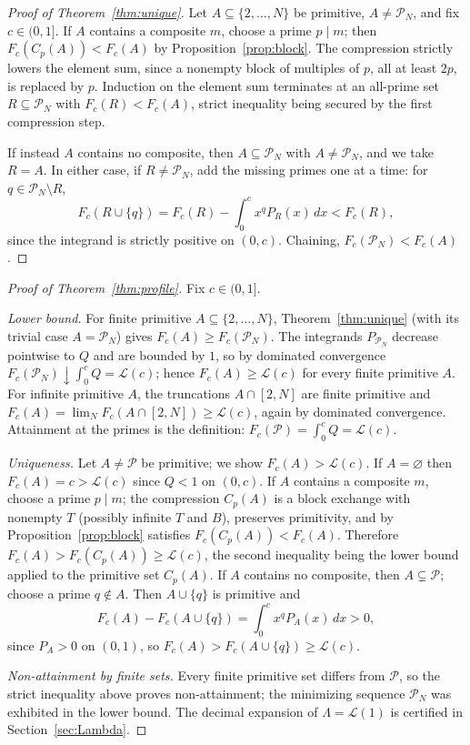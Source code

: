 \documentclass[11pt]{article}
\theoremstyle{remark}
\newcommand{\Prm}{\mathcal{P}}
\begin{document}
\begin{proof}[Proof of Theorem~\ref{thm:unique}]
Let $A\subseteq\{2,\dots,N\}$ be primitive, $A\ne\Prm_N$, and fix
$c\in(0,1]$. If $A$ contains a composite $m$, choose a prime $p\mid m$;
then $F_c(C_p(A))<F_c(A)$ by Proposition~\ref{prop:block}. The
compression strictly lowers the element sum, since a nonempty block of
multiples of $p$, all at least $2p$, is replaced by $p$. Induction on
the element sum terminates at an all-prime set $R\subseteq\Prm_N$ with
$F_c(R)<F_c(A)$, strict inequality being secured by the first
compression step.

If instead $A$ contains no composite, then $A\subseteq\Prm_N$ with
$A\ne\Prm_N$, and we take $R=A$. In either case, if $R\ne\Prm_N$, add
the missing primes one at a time: for $q\in\Prm_N\setminus R$,
\[
  F_c(R\cup\{q\})=F_c(R)-\int_0^cx^qP_R(x)\,dx<F_c(R),
\]
since the integrand is strictly positive on $(0,c)$. Chaining,
$F_c(\Prm_N)<F_c(A)$.
\end{proof}

\begin{proof}[Proof of Theorem~\ref{thm:profile}]
Fix $c\in(0,1]$.

\emph{Lower bound.} For finite primitive $A\subseteq\{2,\dots,N\}$,
Theorem~\ref{thm:unique} (with its trivial case $A=\Prm_N$) gives
$F_c(A)\ge F_c(\Prm_N)$. The integrands $P_{\Prm_N}$ decrease pointwise
to $Q$ and are bounded by $1$, so by dominated convergence
$F_c(\Prm_N)\downarrow\int_0^cQ=\mathcal L(c)$; hence
$F_c(A)\ge\mathcal L(c)$ for every finite primitive $A$. For infinite
primitive $A$, the truncations $A\cap[2,N]$ are finite primitive and
$F_c(A)=\lim_NF_c(A\cap[2,N])\ge\mathcal L(c)$, again by dominated
convergence. Attainment at the primes is the definition:
$F_c(\Prm)=\int_0^cQ=\mathcal L(c)$.

\emph{Uniqueness.} Let $A\ne\Prm$ be primitive; we show
$F_c(A)>\mathcal L(c)$. If $A=\varnothing$ then $F_c(A)=c>\mathcal L(c)$
since $Q<1$ on $(0,c)$. If $A$ contains a composite $m$, choose a prime
$p\mid m$; the compression $C_p(A)$ is a block exchange with nonempty
$T$ (possibly infinite $T$ and $B$), preserves primitivity, and by
Proposition~\ref{prop:block} satisfies $F_c(C_p(A))<F_c(A)$.
Therefore $F_c(A)>F_c(C_p(A))\ge\mathcal L(c)$, the second inequality
being the lower bound applied to the primitive set $C_p(A)$. If $A$
contains no composite, then $A\subsetneq\Prm$; choose a prime
$q\notin A$. Then $A\cup\{q\}$ is primitive and
\[
  F_c(A)-F_c(A\cup\{q\})=\int_0^cx^qP_A(x)\,dx>0,
\]
since $P_A>0$ on $(0,1)$, so
$F_c(A)>F_c(A\cup\{q\})\ge\mathcal L(c)$.

\emph{Non-attainment by finite sets.} Every finite primitive set differs
from $\Prm$, so the strict inequality above proves non-attainment; the
minimizing sequence $\Prm_N$ was exhibited in the lower bound. The
decimal expansion of $\Lambda=\mathcal L(1)$ is certified in
Section~\ref{sec:Lambda}.
\end{proof}
\end{document}
